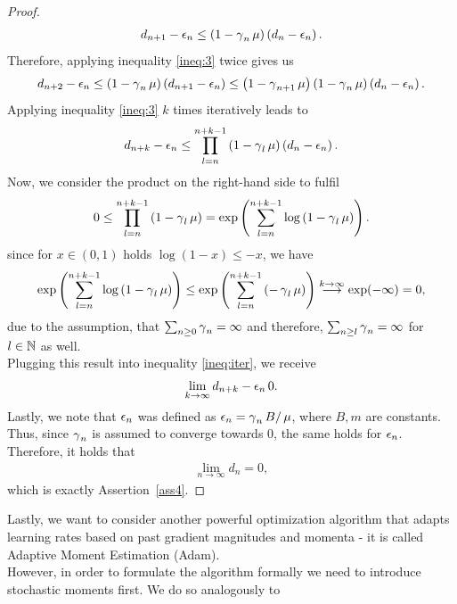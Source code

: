 \begin{proof}
\begin{align}
d_{n+1} - \operatorname{\epsilon}_n \leq \left(1 - \operatorname{\gamma}_n\operatorname{\mu}\right)\left(d_n - \operatorname{\epsilon}_n\right).
\end{align}
Therefore, applying inequality \eqref{ineq:3} twice gives us
\begin{align*}
d_{n+2} - \operatorname{\epsilon}_n \leq \left(1 - \operatorname{\gamma}_n\operatorname{\mu}\right)\left(d_{n+1} - \operatorname{\epsilon}_n\right) \leq \left(1 - \operatorname{\gamma}_{n+1}\operatorname{\mu}\right)\left(1 - \operatorname{\gamma}_n\operatorname{\mu}\right)\left(d_n - \operatorname{\epsilon}_n\right).
\end{align*}
Applying inequality \eqref{ineq:3} $k$ times iteratively leads to
\begin{align}\label{ineq:iter}
d_{n+k} - \operatorname{\epsilon}_n \leq \prod_{l=n}^{n+k-1}\left(1 - \operatorname{\gamma}_l\operatorname{\mu}\right)\left(d_n - \operatorname{\epsilon}_n\right).
\end{align}
Now, we consider the product on the right-hand side to fulfil
\begin{align*}
0 \leq \prod_{l=n}^{n+k-1}\left(1 - \operatorname{\gamma}_l\operatorname{\mu}\right) = \exp \left(\sum_{l=n}^{n+k-1}\log\left(1 - \operatorname{\gamma}_l\operatorname{\mu}\right) \right).
\end{align*}
since for $x\in (0,1)$ holds $\log(1-x) \leq -x$, we have
\begin{align*}
\exp \left(\sum_{l=n}^{n+k-1}\log\left(1 - \operatorname{\gamma}_l\operatorname{\mu}\right) \right) \leq \exp \left(\sum_{l=n}^{n+k-1}\left(- \operatorname{\gamma}_l\operatorname{\mu}\right) \right)\overset{k\to\infty}{\longrightarrow} \exp(-\infty) = 0,
\end{align*}
due to the assumption, that $\sum_{n\geq 0}\operatorname{\gamma}_n = \infty$ and therefore, $\sum_{n\geq l}\operatorname{\gamma}_n = \infty$  for $l\in\operatorname{\mathbb{N}}$ as well.\\
Plugging this result into inequality \eqref{ineq:iter}, we receive
\begin{align*}
\lim_{k\to\infty}d_{n+k} - \operatorname{\epsilon}_n 0.
\end{align*}
Lastly, we note that $\operatorname{\epsilon}_n$ was defined as $\operatorname{\epsilon}_n = \operatorname{\gamma}_n B/\operatorname{\mu}$, where $B, m$ are constants. Thus, since $\operatorname{\gamma}_n$ is assumed to converge towards $0$, the same holds for $\operatorname{\epsilon}_n$. Therefore, it holds that
\begin{align*}
\lim_{n\to\infty}d_{n} = 0,
\end{align*}
which is exactly Assertion~\ref{ass4}.
\end{proof}

Lastly, we want to consider another powerful optimization algorithm that adapts learning rates based on past gradient magnitudes and momenta - it is called \glqq Adaptive Moment Estimation (Adam)\grqq{}.\\
However, in order to formulate the algorithm formally we need to introduce stochastic moments first. We do so analogously to \cite[Chapter~5]{papoulis02}

